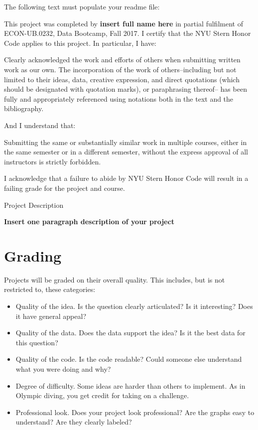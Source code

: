 The following text must populate your readme file:
\bigskip
\bigskip

This project was completed by \textbf{insert full name here} in partial fulfilment of  ECON-UB.0232, Data Bootcamp, Fall 2017. I certify that the NYU Stern Honor Code applies to this project. In particular, I have:

Clearly acknowledged the work and efforts of others when submitting written work as
our own. The incorporation of the work of others--including but not limited to their ideas,
data, creative expression, and direct quotations (which should be designated with quotation
marks), or paraphrasing thereof-- has been fully and appropriately referenced using notations
both in the text and the bibliography.

And I understand that:

Submitting the same or substantially similar work in multiple courses, either in the
same semester or in a different semester, without the express approval of all instructors is
strictly forbidden.

I acknowledge that a failure to abide by NYU Stern Honor Code will result in a failing grade for the project and course.

Project Description

\textbf{Insert one paragraph description of your project}

\newpage

\section*{Grading}

Projects will be graded on their overall quality.  This includes, but is not restricted to,
these categories:
%
\begin{itemize}
\item Quality of the idea.  Is the question clearly articulated?  Is it interesting?
Does it have general appeal?
\item Quality of the data.  Does the data support the idea?
Is it the best data for this question?
\item Quality of the code. Is the code readable? Could someone else understand what you were doing and why?
\item Degree of difficulty.  Some ideas are harder than others to implement.
As in Olympic diving, you get credit for taking on a challenge.
\item Professional look.  Does your project look professional?  Are the graphs
easy to understand?  Are they clearly labeled?
\end{itemize}


%



%


